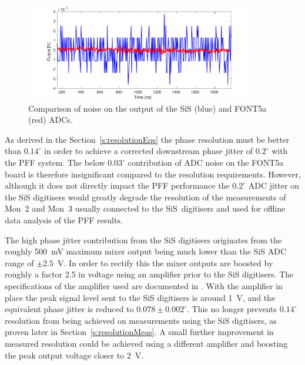 \begin{figure}
  \centering
  \includegraphics[width=0.9\textwidth]{Figures/phaseMons/digitiserNosie}
  \caption{Comparison of noise on the output of the SiS (blue) and FONT5a (red) ADCs.}
  \label{f:digitiserNosie}
\end{figure}

As derived in the Section~\ref{s:resolutionEqs} the phase resolution must be better than \(0.14^\circ\) in order to achieve a corrected downstream phase jitter of \(0.2^\circ\) with the PFF system. The below \(0.03^\circ\) contribution of ADC noise on the FONT5a board is therefore insignificant compared to the resolution requirements. However, although it does not directly impact the PFF performance the \(0.2^\circ\) ADC jitter on the SiS digitisers would greatly degrade the resolution of the measurements of Mon~2 and Mon~3 usually connected to the SiS~digitisers and used for offline data analysis of the PFF results. 

The high phase jitter contribution from the SiS digitisers originates from the roughly 500~mV maximum mixer output being much lower than the SiS ADC range of \(\pm2.5\)~V. In order to rectify this the mixer outputs are boosted by roughly a factor 2.5 in voltage using an amplifier prior to the SiS digitisers. The specifications of the amplifier used are documented in \cite{ampSiS}. With the amplifier in place the peak signal level sent to the SiS digitisers is around 1~V, and the equivalent phase jitter is reduced to \(0.078\pm0.002^\circ\). This no longer prevents \(0.14^\circ\) resolution from being achieved on measurements using the SiS digitisers, as proven later in Section~\ref{s:resolutionMeas}. A small further improvement in measured resolution could be achieved using a different amplifier and boosting the peak output voltage closer to 2~V.

